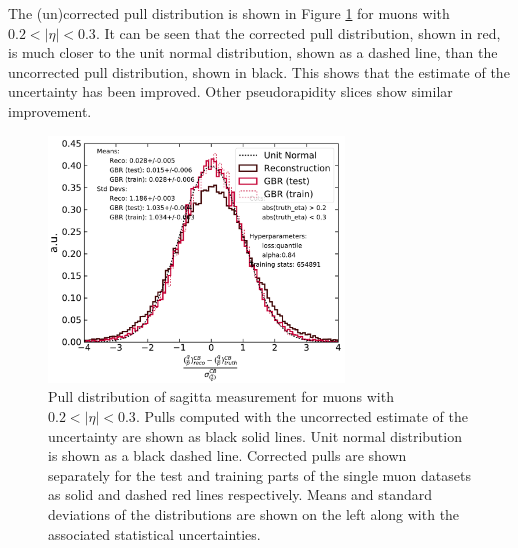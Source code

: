 The (un)corrected pull distribution is shown in Figure \ref{fig:muon:std-single}
for muons with $0.2 < |\eta| < 0.3$.
It can be seen that the corrected pull distribution, shown in red, is much closer
to the unit normal distribution, shown as a dashed line, than the uncorrected
pull distribution, shown in black. This shows that the estimate of the
uncertainty has been improved. Other pseudorapidity slices show similar improvement.
\begin{figure}[h!]
  \centering
  \includegraphics[width=0.7\textwidth]{figures/muons/vader-std-single}
  \caption[VADER4$\mu$ uncertainty correction on the single muon dataset]
  {Pull distribution of sagitta measurement for muons with $0.2 < |\eta| < 0.3$.
  Pulls computed with the uncorrected estimate of the uncertainty are shown
  as black solid lines. Unit normal distribution is shown as a black dashed
  line. Corrected pulls are shown separately for the test and training parts
  of the single muon datasets as solid and dashed red lines respectively.
  Means and standard deviations of the distributions are shown on the left
  along with the associated statistical uncertainties.
  }
  \label{fig:muon:std-single}
\end{figure}






